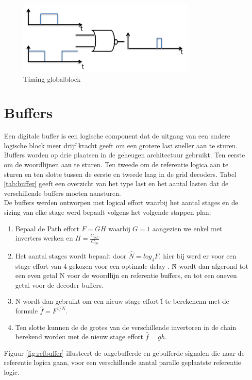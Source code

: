 \begin{figure}[h!]
  \centering
  \includegraphics[width=0.8\textwidth]{../fig/hfdst-decoders-glitch.png}
  \caption{Timing globalblock}
  \label{fig:decoder_glitch}
\end{figure}


\section{Buffers}
Een digitale buffer is een logische component dat de uitgang van een andere logische block meer drijf kracht geeft om een grotere last sneller aan te sturen. Buffers worden op drie plaatsen in de geheugen architectuur gebruikt. Ten eerste om de woordlijnen aan te sturen. Ten tweede om de referentie logica aan te sturen en ten slotte  tussen de eerste en tweede laag in de grid decoders. Tabel \ref{tab:buffer} geeft een overzicht van het type last en het aantal lasten dat de verschillende buffers moeten aansturen.\\
De buffers werden ontworpen met logical effort waarbij het aantal stages en de sizing van elke stage werd bepaalt volgens het volgende stappen plan:
\begin{enumerate}
\item Bepaal de Path effort $F = GH$ waarbij $G = 1$ aangezien we enkel met inverters werken en $H = \frac{C_{out}}{C_{in}}$
\item Het aantal stages wordt bepaalt door $\hat{N} = log_{4}F$. hier bij werd er voor een stage effort van 4 gekozen voor een optimale delay \cite{Sutherland:1999:LED:298513}. \^{N} wordt dan afgerond tot een even getal N voor de woordlijn en referentie buffers, en tot een oneven getal voor de decoder buffers.
\item N wordt dan gebruikt om een nieuw stage effort \^{f} te berekenenn met de formule $\hat{f} = F^{1/N}$.
\item Ten slotte kunnen de de grotes van de verschillende invertoren in de chain berekend worden met de nieuw stage effort $\hat{f} = gh$.
\end{enumerate}
Figuur \ref{fig:refbuffer} illusteert de ongebufferde en gebufferde signalen die naar de referentie logica gaan, voor een verschillende aantal paralle geplaatste referentie logic.

